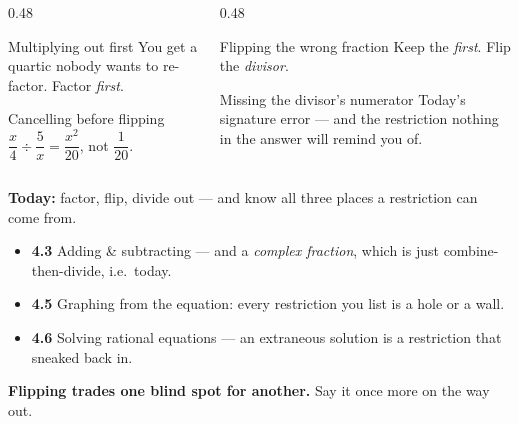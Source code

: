 \documentclass[aspectratio=169, 11pt]{beamer}
\begin{document}
\begin{frame}[t, plain]
  \begin{columns}[T]
    \begin{column}{0.48\textwidth}
      \begin{block}{Multiplying out first}
        You get a quartic nobody wants to re-factor. Factor \emph{first}.
      \end{block}
      \vspace{3pt}
      \begin{block}{Cancelling before flipping}
        $\dfrac{x}{4}\div\dfrac{5}{x}=\dfrac{x^2}{20}$, not $\dfrac{1}{20}$.
      \end{block}
    \end{column}
    \begin{column}{0.48\textwidth}
      \begin{block}{Flipping the wrong fraction}
        Keep the \emph{first}. Flip the \emph{divisor}.
      \end{block}
      \vspace{3pt}
      \begin{block}{Missing the divisor's numerator}
        Today's signature error --- and the restriction nothing in the answer will remind you of.
      \end{block}
    \end{column}
  \end{columns}
\end{frame}

\begin{frame}[t, plain]
  \textbf{Today:} factor, flip, divide out --- and know all three places a restriction can come
  from.\\[8pt]
  \begin{itemize}\setlength{\itemsep}{3pt}
    \item \textbf{4.3} Adding \& subtracting --- and a \emph{complex fraction}, which is just
          combine-then-divide, i.e.\ today.
    \item \textbf{4.5} Graphing from the equation: every restriction you list is a hole or a wall.
    \item \textbf{4.6} Solving rational equations --- an extraneous solution is a restriction that
          sneaked back in.
  \end{itemize}
  \vspace{6pt}
  \begin{center}
    \textbf{Flipping trades one blind spot for another.} Say it once more on the way out.
  \end{center}
\end{frame}
\end{document}

